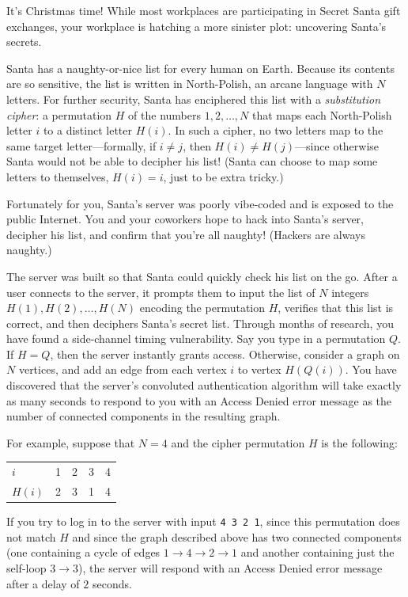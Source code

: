 
\newcommand{\jmaxn}{220}
\newcommand{\jmaxqueries}{1\,510}

It's Christmas time! While most workplaces are participating in Secret Santa gift exchanges, your workplace is hatching a more sinister plot: uncovering Santa's secrets.

Santa has a naughty-or-nice list for every human on Earth. Because its contents are so sensitive, the list is written in North-Polish, an arcane language with $N$ letters. For further security, Santa has enciphered this list with a \emph{substitution cipher}: a permutation $H$ of the numbers $1, 2, \ldots, N$ that maps each North-Polish letter $i$ to a distinct letter $H(i)$. In such a cipher, no two letters map to the same target letter---formally, if $i\neq j$, then $H(i) \neq H(j)$---since otherwise Santa would not be able to decipher his list! (Santa can choose to map some letters to themselves, $H(i) = i$, just to be extra tricky.)

Fortunately for you, Santa's server was poorly vibe-coded and is exposed to the public Internet. You and your coworkers hope to hack into Santa's server, decipher his list, and confirm that you're all naughty! (Hackers are always naughty.)

The server was built so that Santa could quickly check his list on the go. After a user connects to the server, it prompts them to input the list of $N$ integers $H(1), H(2), \ldots, H(N)$ encoding the permutation $H$, verifies that this list is correct, and then deciphers Santa's secret list.
Through months of research, you have found a side-channel timing vulnerability. Say you type in a permutation $Q$. If $H=Q$, then the server instantly grants access. Otherwise, consider a graph on $N$ vertices, and add an edge from each vertex $i$ to vertex $H(Q(i))$. You have discovered that the server's convoluted authentication algorithm will take exactly as many seconds to respond to you with an Access Denied error message as the number of connected components in the resulting graph.

For example, suppose that $N=4$ and the cipher permutation $H$ is the following:
\begin{center}
  \begin{tabular}{l|cccc}
    $i$ & 1 & 2 & 3 & 4\\
    $H(i)$ & 2 & 3 & 1 & 4
  \end{tabular}
\end{center}
If you try to log in to the server with input \texttt{4 3 2 1}, since this permutation does not match $H$ and since the graph described above has two connected components (one containing a cycle of edges $1 \to 4 \to 2 \to 1$ and another containing just the self-loop $3 \to 3$), the server will respond with an Access Denied error message after a delay of $2$ seconds.

